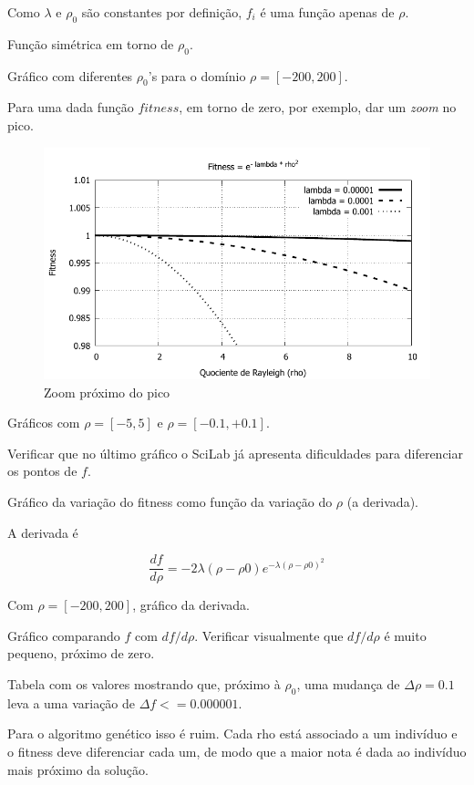 	Como $\lambda$ e $\rho_0$ são constantes por definição, $f_i$ é uma função apenas de $\rho$.
	
	Função simétrica em torno de $\rho_0$.
	
	Gráfico com diferentes $\rho_0$'s para o domínio $\rho = [-200,200]$. 
	
	Para uma dada função $fitness$, em torno de zero, por exemplo, dar um \textit{zoom} no pico.
	
	\begin{figure}[htbp]
		\centering
			\includegraphics{figs/varios-fit-mono-zoom.pdf}
		\caption{Zoom próximo do pico}
		\label{fig:varios-fit-mono-zoom}
	\end{figure}
	
	
	Gráficos com $\rho = [-5,5]$ e $\rho = [-0.1,+0.1]$.
	
	Verificar que no último gráfico o SciLab já apresenta dificuldades para diferenciar os pontos de $f$.
	
	Gráfico da variação do fitness como função da variação do $\rho$ (a derivada).
	
	A derivada é 
	
	$$
		\frac{df}{d\rho} = -2\lambda(\rho - \rho0)e^{-\lambda(\rho - \rho0)^2}
	$$
	
	Com $\rho = [-200,200]$, gráfico da derivada.
	
	Gráfico comparando $f$ com $df/d\rho$. Verificar visualmente que $df/d\rho$ é muito pequeno, próximo de zero. 
	
	Tabela com os valores mostrando que, próximo à $\rho_0$, uma mudança de $\Delta\rho = 0.1$ leva a uma variação de $\Delta f <= 0.000001$.
	
	Para o algoritmo genético isso é ruim. Cada rho está associado a um indivíduo e o fitness deve diferenciar cada um, de modo que a maior nota é dada ao indivíduo mais próximo da solução.
	
